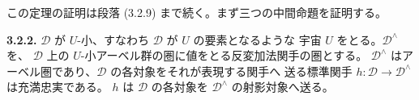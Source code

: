この定理の証明は段落 (3.2.9) まで続く。まず三つの中間命題を証明する。

\medskip
\noindent\textbf{3.2.2.}\quad
$\mathcal D$ が $U$-小、すなわち $\mathcal D$ が $U$ の要素となるような
宇宙 $U$ をとる。$\mathcal D^\wedge$ を、
$\mathcal D$ 上の $U$-小アーベル群の圏に値をとる反変加法関手の圏とする。
$\mathcal D^\wedge$ はアーベル圏であり、$\mathcal D$ の各対象をそれが表現する関手へ
送る標準関手 $h\colon\mathcal D\to\mathcal D^\wedge$ は充満忠実である。
$h$ は $\mathcal D$ の各対象を $\mathcal D^\wedge$ の射影対象へ送る。
\endgroup
